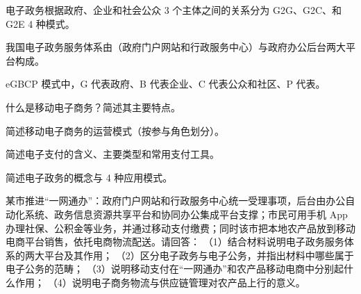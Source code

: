 \documentclass[a4paper,11pt]{article}
\begin{document}
\q 电子政务根据政府、企业和社会公众 3 个主体之间的关系分为 G2G、G2C、\fillblanks[1.8cm]和 G2E 4 种模式。

\q 我国电子政务服务体系由\fillblanks[2.8cm]（政府门户网站和行政服务中心）与政府办公后台两大平台构成。

\q eGBCP 模式中，G 代表政府、B 代表企业、C 代表公众和社区、P 代表\fillblanks[2.8cm]。

\q 什么是移动电子商务？简述其主要特点。\anslines{2.4cm}

\q 简述移动电子商务的运营模式（按参与角色划分）。\anslines{2.4cm}

\q 简述电子支付的含义、主要类型和常用支付工具。\anslines{2.4cm}

\q 简述电子政务的概念与 4 种应用模式。\anslines{2.4cm}

\newpage
{}
\q 某市推进“一网通办”：政府门户网站和行政服务中心统一受理事项，后台由办公自动化系统、政务信息资源共享平台和协同办公集成平台支撑；市民可用手机 App 办理社保、公积金等业务，并通过移动支付缴费；同时该市把本地农产品放到移动电商平台销售，依托电商物流配送。请回答：
（1）结合材料说明电子政务服务体系的两大平台及其作用；
（2）区分电子政务与电子公务，并指出材料中哪些属于电子公务的范畴；
（3）说明移动支付在“一网通办”和农产品移动电商中分别起什么作用；
（4）说明电子商务物流与供应链管理对农产品上行的意义。\anslines{5cm}
\end{document}
